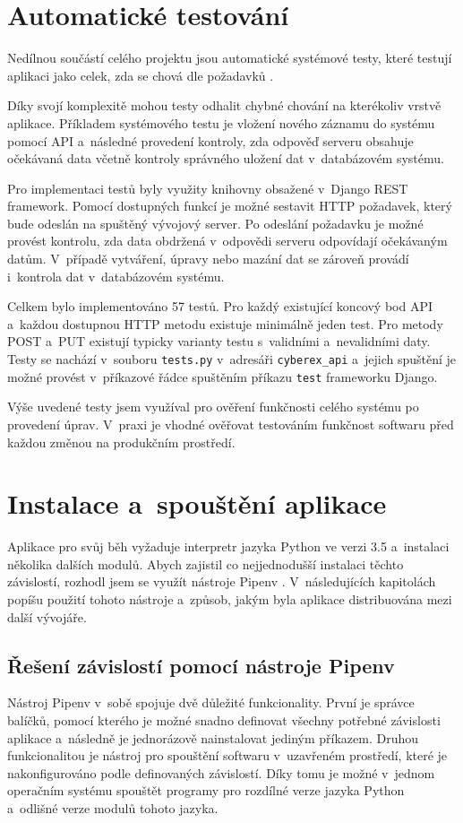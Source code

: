 \documentclass[
  digital,
  twoside,
  table, 
  nolof, 
  nolot
]{fithesis3}
\begin{document}
\section{Automatické testování}
\label{testovani}
Nedílnou součástí celého projektu jsou automatické systémové testy, které testují aplikaci jako celek, zda se chová dle požadavků \cite{difSysTest}.

Díky svojí komplexitě mohou testy odhalit chybné chování na kterékoliv vrstvě aplikace. Příkladem systémového testu je vložení nového záznamu do systému pomocí API a~následné provedení kontroly, zda odpověď serveru obsahuje očekávaná data včetně kontroly správného uložení dat v~databázovém systému.

Pro implementaci testů byly využity knihovny obsažené v~Django REST framework. Pomocí dostupných funkcí je možné sestavit HTTP požadavek, který bude odeslán na spuštěný vývojový server. Po odeslání požadavku je možné provést kontrolu, zda data obdržená v~odpovědi serveru odpovídají očekávaným datům. V~případě vytváření, úpravy nebo mazání dat se zároveň provádí i~kontrola dat v~databázovém systému. 

Celkem bylo implementováno 57 testů. Pro každý existující koncový bod API a~každou dostupnou HTTP metodu existuje minimálně jeden test. Pro metody POST a~PUT existují typicky varianty testu s~validními a~nevalidními daty. Testy se nachází v~souboru \texttt{tests.py} v~adresáři \texttt{cyberex\_api} a~jejich spuštění je možné provést v~příkazové řádce spuštěním příkazu \texttt{test} frameworku Django.

Výše uvedené testy jsem využíval pro ověření funkčnosti celého systému po provedení úprav. V~praxi je vhodné ověřovat testováním funkčnost softwaru před každou změnou na produkčním prostředí.

\section{Instalace a~spouštění aplikace}
Aplikace pro svůj běh vyžaduje interpretr jazyka Python ve verzi 3.5 a~instalaci několika dalších modulů. Abych zajistil co nejjednodušší instalaci těchto závislostí, rozhodl jsem se využít nástroje Pipenv \cite{pipenv}. V~následujících kapitolách popíšu použití tohoto nástroje a~způsob, jakým byla aplikace distribuována mezi další vývojáře.

\subsection{Řešení závislostí pomocí nástroje Pipenv}
Nástroj Pipenv v~sobě spojuje dvě důležité funkcionality. První je správce balíčků, pomocí kterého je možné snadno definovat všechny potřebné závislosti aplikace a~následně je jednorázově nainstalovat jediným příkazem. Druhou funkcionalitou je nástroj pro spouštění softwaru v~uzavřeném prostředí, které je nakonfigurováno podle definovaných závislostí. Díky tomu je možné v~jednom operačním systému spouštět programy pro rozdílné verze jazyka Python a~odlišné verze modulů tohoto jazyka.
\end{document}
